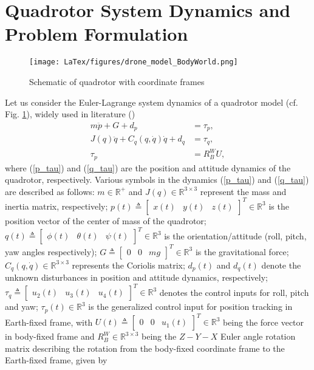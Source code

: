 \section{Quadrotor System Dynamics and Problem Formulation}\label{sec:asmc_dyn}
\begin{figure}[!h]
    \texttt{[image: LaTex/figures/drone\_model\_BodyWorld.png]}
    \centering
    \caption{Schematic of quadrotor with coordinate frames}
    \label{fig:quad_axis}
\end{figure}
	Let us consider the Euler-Lagrange system dynamics of a quadrotor model (cf. Fig. \ref{fig:quad_axis}), widely used in literature (\cite{bialy2013lyapunov})
	\begin{align}	
		m \ddot{p} + G + d_p &= \tau_p, \label{p_tau} \\
		J (q)\ddot{q} + C_q(q,\dot{q})\dot{q} + d_q &= \tau_q, \label{q_tau} \\
		\tau_p &= R_B^WU, \label{tau_conv}
	\end{align}
	where (\ref{p_tau}) and (\ref{q_tau}) are the position and attitude dynamics of the quadrotor, respectively. Various symbols in the dynamics (\ref{p_tau}) and (\ref{q_tau}) are described as follows: $m \in \mathbb{R}^{+}$ and $J(q) \in \mathbb{R}^{3 \times 3}$ represent the mass and inertia matrix, respectively; $p(t)\triangleq
	\begin{bmatrix}
	x(t) & y(t) & z(t)
	\end{bmatrix}^T \in\mathbb{R}^3$ is the position vector of the center of mass of the quadrotor; $q(t)\triangleq \begin{bmatrix}
	\phi(t) & \theta(t) & \psi(t) 
	\end{bmatrix}^T\in \mathbb{R}^3$ is the orientation/attitude (roll, pitch, yaw angles respectively); $G\triangleq
	\begin{bmatrix}
	0 & 0 & mg
	\end{bmatrix}^T\in \mathbb{R}^3$ is the gravitational force; $C_q(q, \dot{q}) \in \mathbb{R}^{3 \times3}$ represents the Coriolis matrix; $d_p(t)$ and $d_q(t)$ denote the unknown disturbances in position and attitude dynamics, respectively; $\tau_q \triangleq 
	\begin{bmatrix}
	u_2(t) & u_3(t) & u_4(t)
	\end{bmatrix}^T\in\mathbb{R}^3$ denotes the control inputs for roll, pitch and yaw; $\tau_p(t) \in \mathbb{R}^3$ is the generalized control input for position tracking in Earth-fixed frame, with $U(t)\triangleq
	\begin{bmatrix}
	0 & 0 & u_1(t)
	\end{bmatrix}^T\in \mathbb{R}^3$ being the force vector in body-fixed frame and $R_B^W \in\mathbb{R}^{3\times3}$ being the $Z-Y-X$ Euler angle rotation matrix describing the rotation from the body-fixed coordinate frame to the Earth-fixed frame, given by
